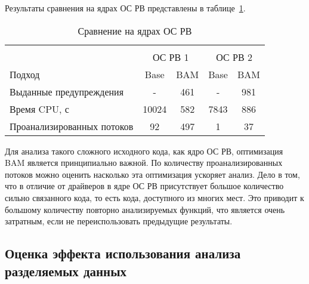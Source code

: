 Результаты сравнения на ядрах ОС РВ представлены в таблице~\ref{table-os-bam}.

  \begin{table}[h]\footnotesize \centering
    \caption{Сравнение на ядрах ОС РВ}
  	\label{table-os-bam}
    \begin{tabular}{ | l | c | c | c | c |  }
      \hline
      		& 		\multicolumn{4}{c|}{\combatmode}  \\
      		& 			 \multicolumn{2}{c|}{ОС РВ 1} & 	\multicolumn{2}{c|}{ОС РВ 2}\\ \hline
      Подход         					& Base  & BAM  		& Base  & BAM 	\\ \hline
      Выданные предупреждения			& -   	& 461  	   	& -		& 981  			\\ 
  	  Время CPU, с 						& 10024 & 582		& 7843  & 886   		\\ 
      Проанализированных потоков		& 92    & 497   	& 1  	& 37  			\\ \hline
    \end{tabular}
  \end{table}

Для анализа такого сложного исходного кода, как ядро ОС РВ, оптимизация BAM является принципиально важной.
По количеству проанализированных потоков можно оценить насколько эта оптимизация ускоряет анализ.
Дело в том, что в отличие от драйверов в ядре ОС РВ присутствует большое количество сильно связанного кода, то есть кода, доступного из многих мест. 
Это приводит к большому количеству повторно анализируемых функций, что является очень затратным, если не переиспользовать предыдущие результаты.

%
%

\subsection{Оценка эффекта использования анализа разделяемых данных}

